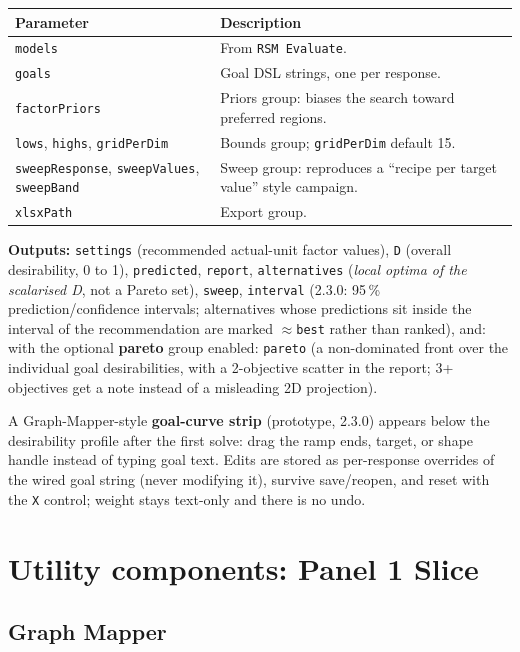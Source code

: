 \documentclass[11pt]{article}
\newcommand{\param}[1]{\texttt{#1}}
\begin{document}
\begin{longtable}{@{}p{3.2cm}p{9.3cm}@{}}
\toprule
\textbf{Parameter} & \textbf{Description} \\
\midrule
\endhead
\param{models} & From \param{RSM Evaluate}. \\
\param{goals} & Goal DSL strings, one per response. \\
\param{factorPriors} & Priors group: biases the search toward preferred regions. \\
\param{lows}, \param{highs}, \param{gridPerDim} & Bounds group; \param{gridPerDim} default 15. \\
\param{sweepResponse}, \param{sweepValues}, \param{sweepBand} & Sweep group: reproduces a ``recipe per target value'' style campaign. \\
\param{xlsxPath} & Export group. \\
\bottomrule
\end{longtable}

\textbf{Outputs:} \param{settings} (recommended actual-unit factor
values), \param{D} (overall desirability, 0 to 1), \param{predicted},
\param{report}, \param{alternatives} (\emph{local optima of the
scalarised D}, not a Pareto set), \param{sweep}, \param{interval}
(2.3.0: 95\,\% prediction/confidence intervals; alternatives whose
predictions sit inside the interval of the recommendation are marked
\texttt{$\approx$best} rather than ranked), and: with the optional
\textbf{pareto} group enabled: \param{pareto} (a non-dominated front
over the individual goal desirabilities, with a 2-objective scatter in
the report; 3+ objectives get a note instead of a misleading 2D
projection).

A Graph-Mapper-style \textbf{goal-curve strip} (prototype, 2.3.0)
appears below the desirability profile after the first solve: drag the
ramp ends, target, or shape handle instead of typing goal text. Edits
are stored as per-response overrides of the wired goal string (never
modifying it), survive save/reopen, and reset with the \texttt{X}
control; weight stays text-only and there is no undo.

\section{Utility components: Panel 1 Slice}

\subsection{Graph Mapper}
\end{document}
